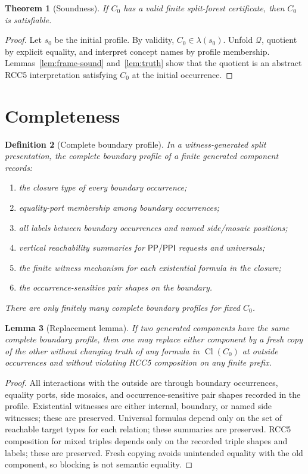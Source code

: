 \documentclass[11pt]{article}
\newtheorem{theorem}{Theorem}[section]
\newtheorem{lemma}[theorem]{Lemma}
\newtheorem{definition}[theorem]{Definition}
\newcommand{\Cl}{\operatorname{Cl}}
\newcommand{\PP}{\mathsf{PP}}
\newcommand{\PPI}{\mathsf{PPI}}
\newcommand{\Q}{\mathcal Q}
\begin{document}
\begin{theorem}[Soundness]
If \(C_0\) has a valid finite split-forest certificate, then \(C_0\) is satisfiable.
\end{theorem}

\begin{proof}
Let \(s_0\) be the initial profile.  By validity, \(C_0\in\lambda(s_0)\).  Unfold \(\Q\), quotient by explicit equality, and interpret concept names by profile membership.  Lemmas~\ref{lem:frame-sound} and~\ref{lem:truth} show that the quotient is an abstract RCC5 interpretation satisfying \(C_0\) at the initial occurrence.
\end{proof}

\section{Completeness}

\begin{definition}[Complete boundary profile]
In a witness-generated split presentation, the complete boundary profile of a finite generated component records:
\begin{enumerate}[label=(B\arabic*)]
\item the closure type of every boundary occurrence;
\item equality-port membership among boundary occurrences;
\item all labels between boundary occurrences and named side/mosaic positions;
\item vertical reachability summaries for \(\PP/\PPI\) requests and universals;
\item the finite witness mechanism for each existential formula in the closure;
\item the occurrence-sensitive pair shapes on the boundary.
\end{enumerate}
There are only finitely many complete boundary profiles for fixed \(C_0\).
\end{definition}

\begin{lemma}[Replacement lemma]\label{lem:replacement}
If two generated components have the same complete boundary profile, then one may replace either component by a fresh copy of the other without changing truth of any formula in \(\Cl(C_0)\) at outside occurrences and without violating RCC5 composition on any finite prefix.
\end{lemma}

\begin{proof}
All interactions with the outside are through boundary occurrences, equality ports, side mosaics, and occurrence-sensitive pair shapes recorded in the profile.  Existential witnesses are either internal, boundary, or named side witnesses; these are preserved.  Universal formulas depend only on the set of reachable target types for each relation; these summaries are preserved.  RCC5 composition for mixed triples depends only on the recorded triple shapes and labels; these are preserved.  Fresh copying avoids unintended equality with the old component, so blocking is not semantic equality.
\end{proof}
\end{document}
